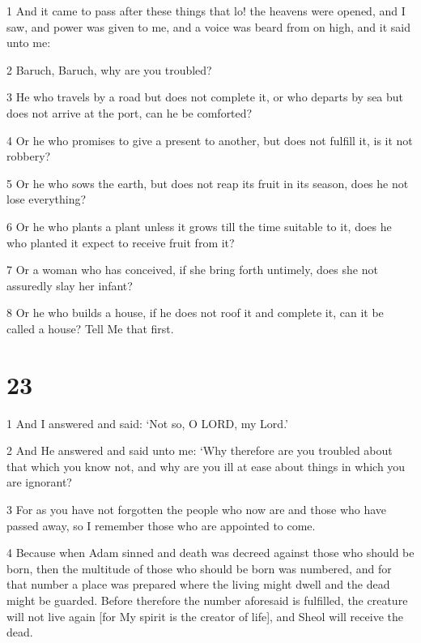 \par 1 And it came to pass after these things that lo! the heavens were opened, and I saw, and power was given to me, and a voice was beard from on high, and it said unto me: 

\par 2 Baruch, Baruch, why are you troubled? 

\par 3 He who travels by a road but does not complete it, or who departs by sea but does not arrive at the port, can he be comforted? 

\par 4 Or he who promises to give a present to another, but does not fulfill it, is it not robbery? 

\par 5 Or he who sows the earth, but does not reap its fruit in its season, does he not lose everything? 

\par 6 Or he who plants a plant unless it grows till the time suitable to it, does he who planted it expect to receive fruit from it? 

\par 7 Or a woman who has conceived, if she bring forth untimely, does she not assuredly slay her infant? 

\par 8 Or he who builds a house, if he does not roof it and complete it, can it be called a house? Tell Me that first.

\chapter{23}

\par 1 And I answered and said: ‘Not so, O LORD, my Lord.’

\par 2 And He answered and said unto me: ‘Why therefore are you troubled about that which you know not, and why are you ill at ease about things in which you are ignorant? 

\par 3 For as you have not forgotten the people who now are and those who have passed away, so I remember those who are appointed to come. 

\par 4 Because when Adam sinned and death was decreed against those who should be born, then the multitude of those who should be born was numbered, and for that number a place was prepared where the living might dwell and the dead might be guarded. Before therefore the number aforesaid is fulfilled, the creature will not live again [for My spirit is the creator of life], and Sheol will receive the dead. 

